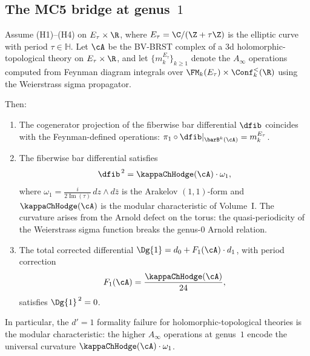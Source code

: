 \subsection{The MC5 bridge at genus~$1$}

\begin{theorem}[Feynman curvature = modular characteristic at genus~$1$;
\ClaimStatusProvedHere]
Assume \textrm{(H1)--(H4)} on $E_\tau \times \R$, where
$E_\tau = \C/(\Z + \tau\Z)$ is the elliptic curve with period
$\tau \in \mathbb{H}$. Let $\cA$ be the BV-BRST complex of a 3d
holomorphic-topological theory on $E_\tau \times \R$, and let
$\{m_k^{E_\tau}\}_{k \geq 1}$ denote the $A_\infty$ operations
computed from Feynman diagram integrals over
$\FM_k(E_\tau) \times \Conf_k^{<}(\R)$ using the Weierstrass
sigma propagator.

Then:
\begin{enumerate}[label=\textup{(\roman*)}]
\item The cogenerator projection of the fiberwise bar differential
 $\dfib$ coincides with the Feynman-defined operations:
 $\pi_1 \circ \dfib|_{\barB^k(\cA)} = m_k^{E_\tau}$.
\item The fiberwise bar differential satisfies
 \begin{equation}
 \dfib^{\,2} = \kappaChHodge(\cA) \cdot \omega_1,
 \end{equation}
 where $\omega_1 = \frac{i}{2\operatorname{Im}(\tau)}\,dz \wedge
 d\bar{z}$ is the Arakelov $(1,1)$-form and $\kappaChHodge(\cA)$ is the
 modular characteristic of Volume~I. The curvature arises from
 the Arnold defect on the torus: the quasi-periodicity of the
 Weierstrass sigma function breaks the genus-$0$ Arnold relation.
\item The total corrected differential
 $\Dg{1} = d_0 + F_1(\cA) \cdot d_1$, with period correction
 \[
 F_1(\cA) = \frac{\kappaChHodge(\cA)}{24},
 \]
 satisfies $\Dg{1}^{\,2} = 0$.
\end{enumerate}
In particular, the $d' = 1$ formality failure for holomorphic-topological
theories is the modular
characteristic: the higher $A_\infty$ operations at genus~$1$ encode
the universal curvature $\kappaChHodge(\cA) \cdot \omega_1$.
\end{theorem}


